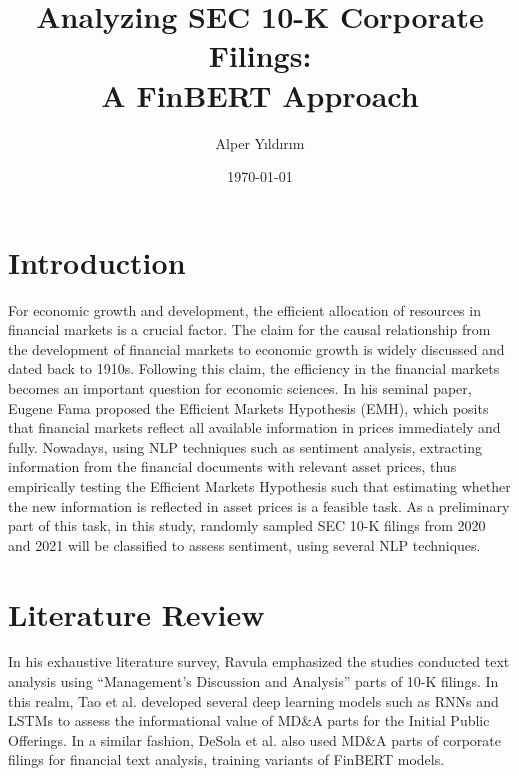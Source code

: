 \documentclass{article}
\title{Analyzing SEC 10-K Corporate Filings:\\ A FinBERT Approach}
\author{Alper Yıldırım}
\date{\today}
\begin{document}
\maketitle


\section{Introduction}

For economic growth and development, the efficient allocation of resources in financial markets is a crucial factor. The claim for the causal relationship from the development of financial markets to economic growth is widely discussed and dated back to 1910s. \cite{schumpeter1911} \cite{king1993finance} \cite{levine1997financial} Following this claim, the efficiency in the financial markets becomes an important question for economic sciences. In his seminal paper, Eugene Fama proposed the Efficient Markets Hypothesis (EMH), which posits that financial markets reflect all available information in prices immediately and fully. \cite{fama1970efficient} Nowadays, using NLP techniques such as sentiment analysis, extracting information from the financial documents with relevant asset prices, thus empirically testing the Efficient Markets Hypothesis such that estimating whether the new information is reflected in asset prices is a feasible task. As a preliminary part of this task, in this study, randomly sampled SEC 10-K filings from 2020 and 2021 will be classified to assess sentiment, using several NLP techniques.
\\ 

\section{Literature Review}

In his exhaustive literature survey, Ravula emphasized the studies conducted text analysis using ``Management's Discussion and Analysis'' parts of 10-K filings. \cite{ravula2021text} In this realm, Tao et al. developed several deep learning models such as RNNs and LSTMs to assess the informational value of MD\&A parts for the Initial Public Offerings. \cite{tao2018analysing} In a similar fashion, DeSola et al. also used MD\&A parts of corporate filings for financial text analysis, training variants of FinBERT models. \cite{desola2019finbert} \\
\end{document}
